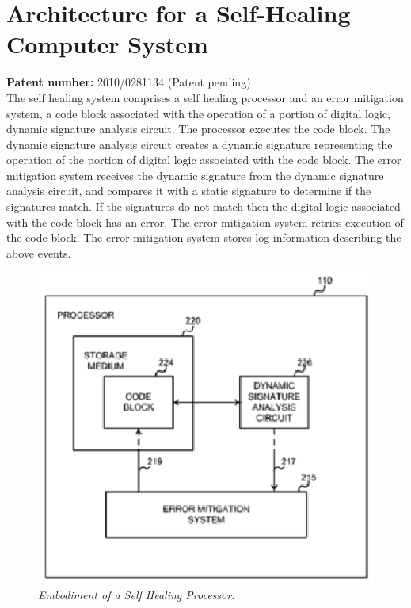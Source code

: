 \section{Architecture for a Self-Healing Computer System}
\textbf{Patent number:}  2010/0281134 (Patent pending)\cite{MELEN:2010}\\
The self healing system comprises a self healing processor and an error mitigation system, a code block associated with the operation of a portion of digital logic, dynamic signature analysis circuit. The processor executes the code block. The dynamic signature analysis circuit creates a dynamic signature representing the operation of the portion of digital logic associated with the code block. The error mitigation system receives the dynamic signature from the dynamic signature analysis circuit, and compares it with a static signature to determine if the signatures match. If the signatures do not match then the digital logic associated with the code block has an error. The error mitigation system retries execution of the code block. The error mitigation system stores log information describing the above events.
	\begin{figure}[h]
		\begin{center} 
			\includegraphics{figures/patent2_1.eps} 
			\caption{\small \sl Embodiment of a Self Healing Processor.\label{fig:Label3}} 
		\end{center} 
	\end{figure}

